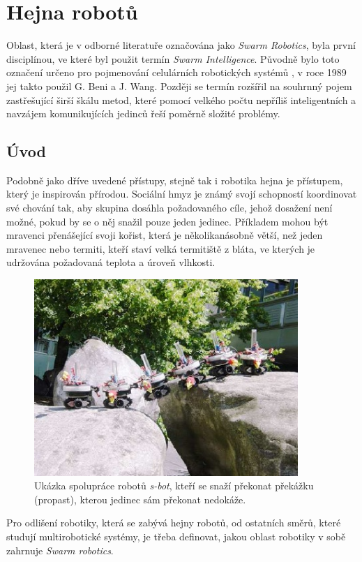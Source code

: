 \documentclass[a4paper,12pt]{article}
\begin{document}
\section{Hejna robotů}
Oblast, která je v odborné literatuře označována jako {\it Swarm Robotics}, byla první
disciplínou, ve které byl použit termín {\it Swarm Intelligence}. Původně bylo toto
označení určeno pro pojmenování celulárních robotických systémů \cite{BeniWang89}, v roce
1989 jej takto použil G. Beni a J. Wang. Později se termín rozšířil na souhrnný pojem
zastřešující širší škálu metod, které pomocí velkého počtu nepříliš inteligentních
a navzájem komunikujících jedinců řeší poměrně složité problémy.

\subsection{Úvod}
Podobně jako dříve uvedené přístupy, stejně tak i robotika hejna je přístupem, který
je inspirován přírodou. Sociální hmyz je známý svojí schopností koordinovat své
chování tak, aby skupina dosáhla požadovaného cíle, jehož dosažení není možné,
pokud by se o něj snažil pouze jeden jedinec. Příkladem mohou být mravenci
přenášející svoji kořist, která je několikanásobně větší, než jeden mravenec
nebo termiti, kteří staví velká termitiště z bláta, ve kterých je udržována
požadovaná teplota a úroveň vlhkosti.

\begin{figure}[here]
  \centering
  \includegraphics[width=10cm]{./img/sbot.jpg}
  \caption{Ukázka spolupráce robotů {\it s-bot}, kteří se snaží překonat překážku
    (propast), kterou jedinec sám překonat nedokáže.}
\end{figure}

Pro odlišení robotiky, která se zabývá hejny robotů, od ostatních směrů, které
studují multirobotické systémy, je třeba definovat, jakou oblast robotiky v sobě
zahrnuje {\it Swarm robotics}.
\end{document}
